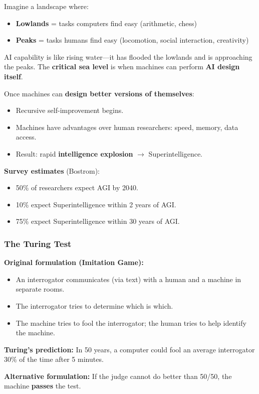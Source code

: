 \begin{defbox}
Imagine a landscape where:
\begin{itemize}
  \item \textbf{Lowlands} = tasks computers find easy (arithmetic, chess)
  \item \textbf{Peaks} = tasks humans find easy (locomotion, social interaction, creativity)
\end{itemize}

AI capability is like rising water---it has flooded the lowlands and is approaching the peaks. The \textbf{critical sea level} is when machines can perform \textbf{AI design itself}.
\end{defbox}

\begin{thmbox}
Once machines can \textbf{design better versions of themselves}:
\begin{itemize}
  \item Recursive self-improvement begins.
  \item Machines have advantages over human researchers: speed, memory, data access.
  \item Result: rapid \textbf{intelligence explosion} $\to$ Superintelligence.
\end{itemize}

\textbf{Survey estimates} (Bostrom):
\begin{itemize}
  \item 50\% of researchers expect AGI by 2040.
  \item 10\% expect Superintelligence within 2 years of AGI.
  \item 75\% expect Superintelligence within 30 years of AGI.
\end{itemize}
\end{thmbox}

\bigseparator

\subsubsection{The Turing Test}

\begin{defbox}
\textbf{Original formulation (Imitation Game):}
\begin{itemize}
  \item An interrogator communicates (via text) with a human and a machine in separate rooms.
  \item The interrogator tries to determine which is which.
  \item The machine tries to fool the interrogator; the human tries to help identify the machine.
\end{itemize}

\textbf{Turing's prediction:} In 50 years, a computer could fool an average interrogator 30\% of the time after 5 minutes.

\textbf{Alternative formulation:} If the judge cannot do better than 50/50, the machine \textbf{passes} the test.
\end{defbox}

